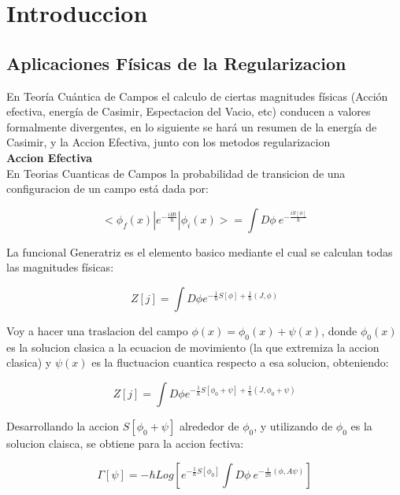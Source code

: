 \chapter{Introduccion}


\section{Aplicaciones Físicas de la Regularizacion}

En Teoría Cuántica de Campos el calculo de ciertas magnitudes físicas (Acción efectiva, energía de Casimir, Espectacion del Vacio, etc) conducen a valores formalmente divergentes, en lo siguiente se hará un resumen de la energía de Casimir, y la Accion Efectiva, junto con los metodos regularizacion\\





\textbf{Accion Efectiva}\\

En Teorias Cuanticas de Campos la probabilidad de transicion de una configuracion de un campo está dada por:

\begin{equation}
< \phi _f (x) | e ^{- \frac{i H t}{\hbar}} | \phi _i (x) > =
\int D \phi \ e ^{- \frac{i S[\phi]}{\hbar}}
\end{equation}

La funcional Generatriz es el elemento basico mediante el cual se calculan todas las magnitudes físicas:

\begin{equation}
Z[j] = 
\int D \phi
e^{-\frac{1}{\hbar} S[\phi] + \frac{1}{\hbar} (J,\phi) }  
\end{equation}

Voy a hacer una traslacion del campo $\phi (x) = \phi _0 (x) + \psi (x) $, donde $\phi _0 (x)$ es la solucion clasica a la ecuacion de movimiento (la que extremiza la accion clasica) y $\psi (x)$ es la fluctuacion cuantica respecto a esa solucion, obteniendo:

\begin{equation}
Z[j] = 
\int D \phi
e^{-\frac{1}{\hbar} S[\phi _0 + \psi] + \frac{1}{\hbar} (J,\phi _0 + \psi ) }  
\end{equation}

Desarrollando la accion $S[\phi _0 + \psi]$ alrededor de $\phi _0$, y utilizando de $\phi _0$ es la solucion claisca, se obtiene para la accion fectiva:

\begin{equation}
\Gamma [\psi] = 
- \hbar 
Log
\left[
	e ^{-\frac{1}{\hbar} S[\phi _0] }
	\int D \phi \
	e ^{-\frac{1}{2 \hbar} (\phi,A \psi) }
	\right]
\end{equation}




